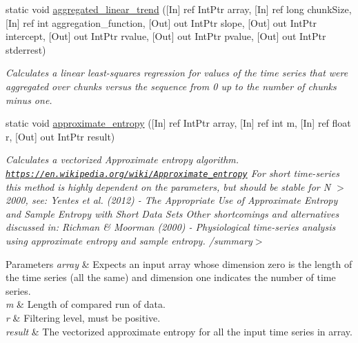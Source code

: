 \begin{DoxyCompactItemize}
static void \mbox{\hyperlink{classkhiva_1_1interop_1_1_d_l_l_features_a4bd96e198aa003b96828ba58045eba6d}{aggregated\+\_\+linear\+\_\+trend}} (\mbox{[}In\mbox{]} ref Int\+Ptr array, \mbox{[}In\mbox{]} ref long chunk\+Size, \mbox{[}In\mbox{]} ref int aggregation\+\_\+function, \mbox{[}Out\mbox{]} out Int\+Ptr slope, \mbox{[}Out\mbox{]} out Int\+Ptr intercept, \mbox{[}Out\mbox{]} out Int\+Ptr rvalue, \mbox{[}Out\mbox{]} out Int\+Ptr pvalue, \mbox{[}Out\mbox{]} out Int\+Ptr stderrest)
\begin{DoxyCompactList}\small\item\em Calculates a linear least-\/squares regression for values of the time series that were aggregated over chunks versus the sequence from 0 up to the number of chunks minus one. \end{DoxyCompactList}\item 
static void \mbox{\hyperlink{classkhiva_1_1interop_1_1_d_l_l_features_ab9469b2de1150c75716fdf3123a1dfc0}{approximate\+\_\+entropy}} (\mbox{[}In\mbox{]} ref Int\+Ptr array, \mbox{[}In\mbox{]} ref int m, \mbox{[}In\mbox{]} ref float r, \mbox{[}Out\mbox{]} out Int\+Ptr result)
\begin{DoxyCompactList}\small\item\em Calculates a vectorized Approximate entropy algorithm. \href{https://en.wikipedia.org/wiki/Approximate_entropy}{\tt https\+://en.\+wikipedia.\+org/wiki/\+Approximate\+\_\+entropy} For short time-\/series this method is highly dependent on the parameters, but should be stable for N $>$ 2000, see\+: Yentes et al. (2012) -\/ The Appropriate Use of Approximate Entropy and Sample Entropy with Short Data Sets Other shortcomings and alternatives discussed in\+: Richman \& Moorman (2000) -\/ Physiological time-\/series analysis using approximate entropy and sample entropy. /summary$>$ 
\begin{DoxyParams}{Parameters}
{\em array} & Expects an input array whose dimension zero is the length of the time series (all the same) and dimension one indicates the number of time series.\\
\hline
{\em m} & Length of compared run of data.\\
\hline
{\em r} & Filtering level, must be positive.\\
\hline
{\em result} & The vectorized approximate entropy for all the input time series in array.\\
\hline
\end{DoxyParams}
\end{DoxyCompactList}\item 

\end{DoxyCompactItemize}
